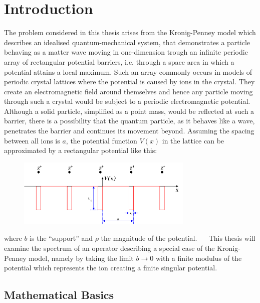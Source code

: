 \chapter{Introduction}

The problem considered in this thesis arises from the Kronig-Penney model which describes an idealised quantum-mechanical system, that demonstrates a particle behaving as a matter wave moving in one-dimension trough an infinite periodic array of rectangular potential barriers, i.e. through a space area in which a potential attains a local maximum. Such an array commonly occurs in models of periodic crystal lattices where the potential is caused by ions in the crystal. They create an electromagnetic field around themselves and hence any particle moving through such a crystal would be subject to a periodic electromagnetic potential. Although a solid particle, simplified as a point mass, would be reflected at such a barrier, there is a possibility that the quantum particle, as it behaves like a wave, penetrates the barrier and continues its movement beyond. Assuming the spacing between all ions is $a$, the potential function $V(x)$ in the lattice can be approximated by a rectangular potential like this:

\begin{figure}[h!] \centering
	  \includegraphics[width=0.75\textwidth]{Periodic_square_potential_130707} 
\end{figure}

where $b$ is the \enquote{support} and $\rho$ the magnitude of the potential.
~\newline ~\newline
This thesis will examine the spectrum of an operator describing a special case of the Kronig-Penney model, namely by taking the limit $b \rightarrow 0$ with a finite modulus of the potential which represents the ion creating a finite singular potential.

\section*{Mathematical Basics}

